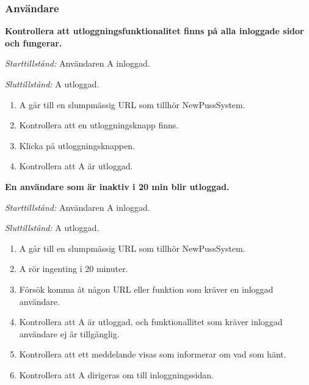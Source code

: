 \documentclass[a4paper]{article}
\begin{document}
\subsubsection{Användare}
\begin{FT}
\item
\textbf{Kontrollera att utloggningsfunktionalitet finns på alla inloggade sidor och fungerar.}

\emph{Starttillstånd:} Användaren A inloggad.

\emph{Sluttillstånd:} A utloggad.

\begin{enumerate}
\item A går till en slumpmässig URL som tillhör NewPussSystem.
\item Kontrollera att en utloggningsknapp finns.
\item Klicka på utloggningsknappen.
\item Kontrollera att A är utloggad.
\end{enumerate}

\item
\textbf{En användare som är inaktiv i 20 min blir utloggad.}

\emph{Starttillstånd:} Användaren A inloggad.

\emph{Sluttillstånd:} A utloggad.

\begin{enumerate}
\item A går till en slumpmässig URL som tillhör NewPussSystem.
\item A rör ingenting i 20 minuter.
\item Försök komma åt någon URL eller funktion som kräver en inloggad användare.
\item Kontrollera att A är utloggad, och funktionallitet som kräver inloggad användare ej är tillgänglig.
\item Kontrollera att ett meddelande visas som informerar om vad som hänt.
\item Kontrollera att A dirigeras om till inloggningssidan.
\end{enumerate}
\end{FT}
\end{document}
